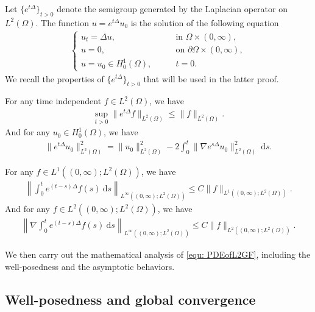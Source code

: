 \documentclass{siamart250211}
\begin{document}
Let $\{e^{t\Delta}\}_{t > 0}$ denote the semigroup generated by the Laplacian operator on $L^2(\Omega)$. The function $u = e^{t\Delta}u_0$ is the solution of the following equation
\begin{align*}
    \begin{cases}
        u_t = \Delta u, \qquad &\text{in $\Omega \times (0,\infty)$}, \\
        u = 0, \qquad &\text{on $\partial\Omega \times (0,\infty)$}, \\
        u = u_0 \in H_0^1(\Omega), \qquad &t = 0.
    \end{cases}
\end{align*}
We recall the properties of $\{e^{t\Delta}\}_{t > 0}$ \cite{antonelli2024existence,BAILLEUL20163344,Jost2013} that will be used in the latter proof.
\begin{prop}\label{prop: 1}
    For any time independent $f \in L^2(\Omega)$, we have 
    \begin{align*}
        \sup_{t>0} \|e^{t\Delta}f\|_{L^2(\Omega)} \le \|f\|_{L^2(\Omega)}.
    \end{align*}
    And for any $u_0 \in H_0^1(\Omega)$, we have 
    \begin{align*}
        \|e^{t\Delta}u_0\|_{L^2(\Omega)}^2 = \|u_0\|_{L^2(\Omega)}^2 - 2\int_0^t \|\nabla e^{s\Delta}u_0\|_{L^2(\Omega)}^2 \ \mathrm{d}s.
    \end{align*}
\end{prop}
\begin{prop}\label{prop: 2}
    For any $f \in L^1((0,\infty);L^2(\Omega))$, we have 
    \begin{align*}
        \left\| \int_0^t e^{(t-s) \Delta} f(s)\ \mathrm{d}s \right\|_{L^{\infty}((0,\infty); L^2(\Omega))} \le C \|f\|_{L^1((0,\infty);L^2(\Omega))}.
    \end{align*}
    And for any $f \in L^2((0,\infty);L^2(\Omega))$, we have 
    \begin{align*}
        \left\|\nabla \int_0^t e^{(t-s) \Delta} f(s)\ \mathrm{d}s \right\|_{L^{\infty}((0,\infty); L^2(\Omega))} \le C \|f\|_{L^2((0,\infty);L^2(\Omega))}.
    \end{align*}
\end{prop}

We then carry out the mathematical analysis of \eqref{equ: PDEofL2GF}, including the well-posedness and the asymptotic behaviors.

\subsection{Well-posedness and global convergence}
\end{document}
